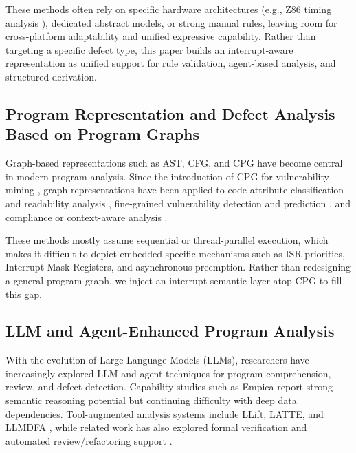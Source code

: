 \documentclass[conference]{IEEEtran}
\begin{document}
These methods often rely on specific hardware architectures (e.g., Z86 timing analysis \cite{brylow2004deadline}), dedicated abstract models, or strong manual rules, leaving room for cross-platform adaptability and unified expressive capability. Rather than targeting a specific defect type, this paper builds an interrupt-aware representation as unified support for rule validation, agent-based analysis, and structured derivation.

\subsection{Program Representation and Defect Analysis Based on Program Graphs}

Graph-based representations such as AST, CFG, and CPG have become central in modern program analysis. Since the introduction of CPG for vulnerability mining \cite{yamaguchi2014modeling}, graph representations have been applied to code attribute classification and readability analysis \cite{liu2023learning, mi2023graph}, fine-grained vulnerability detection and prediction \cite{zhu2023code, shao2025graphfvd, nadim2022leveraging}, and compliance or context-aware analysis \cite{shezan2023chkplug, lekssays2025llmxcpg}.

These methods mostly assume sequential or thread-parallel execution, which makes it difficult to depict embedded-specific mechanisms such as ISR priorities, Interrupt Mask Registers, and asynchronous preemption. Rather than redesigning a general program graph, we inject an interrupt semantic layer atop CPG to fill this gap.

\subsection{LLM and Agent-Enhanced Program Analysis}

With the evolution of Large Language Models (LLMs), researchers have increasingly explored LLM and agent techniques for program comprehension, review, and defect detection. Capability studies such as Empica \cite{nguyen2025empirical} report strong semantic reasoning potential but continuing difficulty with deep data dependencies. Tool-augmented analysis systems include LLift, LATTE, and LLMDFA \cite{li2024enhancing, liu2025llm, wang2024llmdfa}, while related work has also explored formal verification and automated review/refactoring support \cite{ma2026integrating, yu2024fine, li2025codedoctor, nashaat2024towards}.
\end{document}
